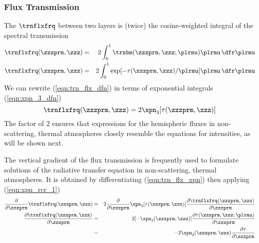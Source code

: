 \documentclass[12pt]{article}
\begin{document}
\subsubsection[Flux Transmission]{Flux Transmission}\label{sxn:flx_trn}
The  $\trnflxfrq$ between two layers
is (twice) the cosine-weighted integral of the spectral transmission  
\begin{eqnarray}
\trnflxfrq(\zzzprm,\zzz) & = & 2 \int_{0}^{1}
\trnbm(\zzzprm,\zzz;\plrmu) \plrmu \,\dfr\plrmu \nonumber \\ 
\trnflxfrq(\zzzprm,\zzz) & = & 2 \int_{0}^{1}
\exp[-\tau(\zzzprm,\zzz)/\plrmu] \plrmu \,\dfr\plrmu
\label{eqn:trn_flx_dfn}
\end{eqnarray}
We can rewrite (\ref{eqn:trn_flx_dfn}) in terms of exponential
integrals (\ref{eqn:xpn_3_dfn})
\begin{equation}
\trnflxfrq(\zzzprm,\zzz) = 2 \xpn_{3}[\tau(\zzzprm,\zzz)]
\label{eqn:trn_flx_xpn}
\end{equation}
The factor of 2 ensures that expressions for the hemispheric fluxes
in non-scattering, thermal atmospheres closely resemble the equations
for intensities, as will be shown next.

The vertical gradient of the flux transmission is frequently used to
formulate solutions of the radiative transfer equation in
non-scattering, thermal atmospheres.
It is obtained by differentiating (\ref{eqn:trn_flx_xpn}) then
applying (\ref{eqn:xpn_rcr_1}) 
\begin{eqnarray}
\frac{\partial}{\partial \zzzprm} \trnflxfrq(\zzzprm,\zzz) & = & 
2 \frac{\partial}{\partial \zzzprm} \xpn_{3}[\tau(\zzzprm,\zzz)] 
\frac{\partial \trnflxfrq(\zzzprm,\zzz)}{\partial \zzzprm} 
\nonumber \\
\frac{\partial \trnflxfrq(\zzzprm,\zzz)}{\partial \zzzprm}
& = & 2 [-\xpn_{2}(\zzzprm,\zzz)] 
\frac{\partial \tau(\zzzprm,\zzz;\plrmu)}{\partial \zzzprm}
\nonumber \\
& = & - 2 \xpn_{2}(\zzzprm,\zzz) 
\frac{\partial \tau}{\partial \zzzprm}
\label{eqn:trn_flx_drv}
\end{eqnarray}
\end{document}
